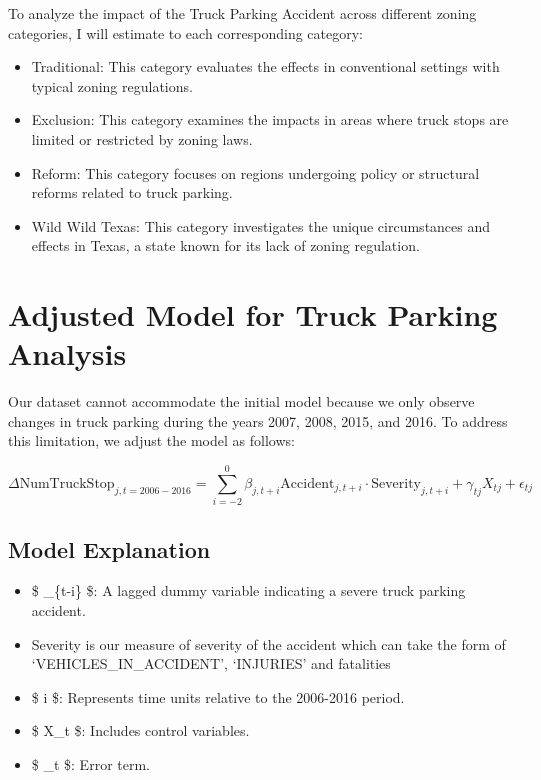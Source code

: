 \documentclass[
  12pt]{article}
\providecommand{\tightlist}{%
  \setlength{\itemsep}{0pt}\setlength{\parskip}{0pt}}\usepackage{longtable,booktabs,array}
\begin{document}
To analyze the impact of the Truck Parking Accident across different
zoning categories, I will estimate to each corresponding category:

\begin{itemize}
\item
  Traditional: This category evaluates the effects in conventional
  settings with typical zoning regulations.
\item
  Exclusion: This category examines the impacts in areas where truck
  stops are limited or restricted by zoning laws.
\item
  Reform: This category focuses on regions undergoing policy or
  structural reforms related to truck parking.
\item
  Wild Wild Texas: This category investigates the unique circumstances
  and effects in Texas, a state known for its lack of zoning regulation.
\end{itemize}

\hypertarget{adjusted-model-for-truck-parking-analysis}{%
\section{Adjusted Model for Truck Parking
Analysis}\label{adjusted-model-for-truck-parking-analysis}}

Our dataset cannot accommodate the initial model because we only observe
changes in truck parking during the years 2007, 2008, 2015, and 2016. To
address this limitation, we adjust the model as follows:

\[
\Delta \text{NumTruckStop}_{j,t=2006-2016} = \sum_{i=-2}^{0} \beta_{j,t+i} \text{Accident}_{j,t+i}\cdot \text{Severity}_{j,t+i} + \gamma_{tj} X_{tj} + \epsilon_{tj}
\]

\hypertarget{model-explanation}{%
\subsection{Model Explanation}\label{model-explanation}}

\begin{itemize}
\tightlist
\item
  \$ \_\{t-i\} \$: A lagged dummy variable indicating a severe
  truck parking accident.
\item
  Severity is our measure of severity of the accident which can take the
  form of `VEHICLES\_IN\_ACCIDENT', `INJURIES' and fatalities
\item
  \$ i \$: Represents time units relative to the 2006-2016 period.
\item
  \$ X\_t \$: Includes control variables.
\item
  \$ \epsilon\_t \$: Error term.
\end{itemize}
\end{document}
